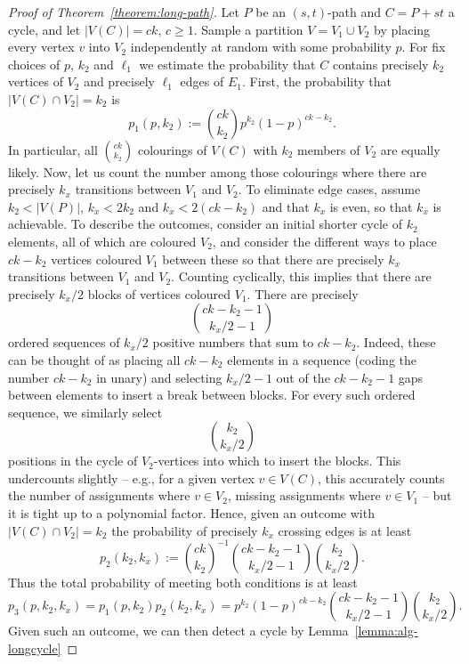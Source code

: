 \documentclass{theoretics}
\begin{document}
\begin{proof}[Proof of Theorem~\ref{theorem:long-path}]
  Let $P$ be an $(s,t)$-path and $C=P+st$ a cycle, and let $|V(C)|=ck$, $c \geq 1$. 
  Sample a partition $V=V_1 \cup V_2$ by placing every vertex $v$ into $V_2$
  independently at random with some probability $p$.
  For fix choices of $p$, $k_2$ and $\ell_1$ we estimate the probability
  that $C$ contains precisely $k_2$ vertices of $V_2$ and
  precisely $\ell_1$ edges of $E_1$.
  First, the probability that $|V(C) \cap V_2|=k_2$ is
  \[
    p_1(p,k_2) := \binom{ck}{k_2} p^{k_2}(1-p)^{ck-k_2}.
  \]
  In particular, all $\binom{ck}{k_2}$ colourings of $V(C)$ 
  with $k_2$ members of $V_2$ are equally likely.
  Now, let us count the number among those colourings where
  there are precisely $k_x$ transitions between $V_1$ and $V_2$. 
  To eliminate edge cases, assume $k_2 < |V(P)|$, $k_x < 2k_2$
  and $k_x < 2(ck-k_2)$ and that $k_x$ is even, so that $k_x$ is achievable.
  To describe the outcomes, consider an initial shorter cycle
  of $k_2$ elements, all of which are coloured $V_2$, and consider
  the different ways to place $ck-k_2$ vertices coloured $V_1$ between
  these so that there are precisely $k_x$ transitions between $V_1$
  and $V_2$. Counting cyclically, this implies that there are
  precisely $k_x/2$ blocks of vertices coloured $V_1$.
  There are precisely
  \[
    \binom{ck-k_2-1}{k_x/2-1}
  \]
  ordered sequences of $k_x/2$ positive numbers that sum to $ck-k_2$.
  Indeed, these can be thought of as placing all $ck-k_2$ elements in
  a sequence (coding the number $ck-k_2$ in unary) and selecting $k_x/2-1$ 
  out of the $ck-k_2-1$ gaps between elements to insert a break between
  blocks. For every such ordered sequence, we similarly select
  \[
    \binom{k_2}{k_x/2}
  \]
  positions in the cycle of $V_2$-vertices into which to insert the blocks.
  This undercounts slightly -- e.g., for a given vertex $v \in V(C)$,
  this accurately counts the number of assignments where $v \in V_2$,
  missing assignments where $v \in V_1$ -- but it is tight up to a
  polynomial factor. Hence, given an outcome with $|V(C) \cap V_2|=k_2$ the probability
  of precisely $k_x$ crossing edges is at least
  \[
    p_2(k_2,k_x) := \binom{ck}{k_2}^{-1} \binom{ck-k_2-1}{k_x/2-1} \binom{k_2}{k_x/2}.
  \]
  Thus the total probability of meeting both conditions is at least
  \[
    p_3(p, k_2, k_x) = p_1(p,k_2) p_2(k_2,k_x)
    = p^{k_2}(1-p)^{ck-k_2} \binom{ck-k_2-1}{k_x/2-1} \binom{k_2}{k_x/2}.
  \]
  Given such an outcome, we can then detect a cycle by Lemma~\ref{lemma:alg-longcycle}

\end{proof}
\end{document}
